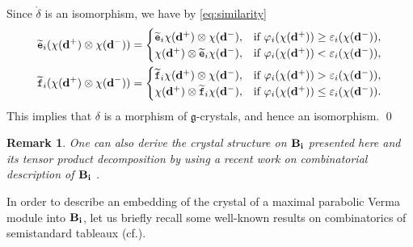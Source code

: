 \documentclass[leqno,11pt]{amsart}
\newtheorem{rem}[thm]{\bf Remark}
\numberwithin{equation}{section}
\newcommand{\bs}{\boldsymbol}
\newcommand{\B}{\mathbf{B}}
\newcommand{\bi}{\bs{\rm i}}
\newcommand{\g}{\mathfrak{g}}
\newcommand{\td}{\widetilde}
\begin{document}
Since $\mathring{\delta}$ is an isomorphism, we have by \eqref{eq:similarity}
\begin{equation*}
\begin{split}
\td{\tt e}_i(\chi({\bf d}^+)\otimes \chi({\bf d}^-))
&=
\begin{cases}
\td{\tt e}_i \chi({\bf d}^+) \otimes \chi({\bf d}^-), & 
\text{if $\varphi_i(\chi({\bf d}^+))\geq \varepsilon_i(\chi({\bf d}^-))$}, \\
\chi({\bf d}^+) \otimes \td{\tt e}_i \chi({\bf d}^-), & \text{if
$\varphi_i(\chi({\bf d}^+))<\varepsilon_i(\chi({\bf d}^-))$},
\end{cases}\\
\td{\tt f}_i(\chi({\bf d}^+)\otimes \chi({\bf d}^-))
&=
\begin{cases}
\td{\tt f}_i \chi({\bf d}^+) \otimes \chi({\bf d}^-), & 
\text{if $\varphi_i(\chi({\bf d}^+))> \varepsilon_i(\chi({\bf d}^-))$}, \\
\chi({\bf d}^+) \otimes \td{\tt f}_i \chi({\bf d}^-), & \text{if
$\varphi_i(\chi({\bf d}^+))\leq\varepsilon_i(\chi({\bf d}^-))$}.
\end{cases}\end{split}
\end{equation*}
This implies that $\delta$ is a morphism of $\g$-crystals, and hence an isomorphism.
\qed

\begin{rem}{\rm One can also derive the crystal structure on ${\B}_{\bi}$ presented here and its tensor product decomposition by using a recent work on combinatorial description of $\B_{\bi}$ \cite{SST}.}
\end{rem}


In order to describe an embedding of the crystal of a maximal parabolic Verma module into $\B_{\bi}$,
let us briefly recall some well-known results on combinatorics of semistandard tableaux (cf.\cite{Ful}).
\end{document}
